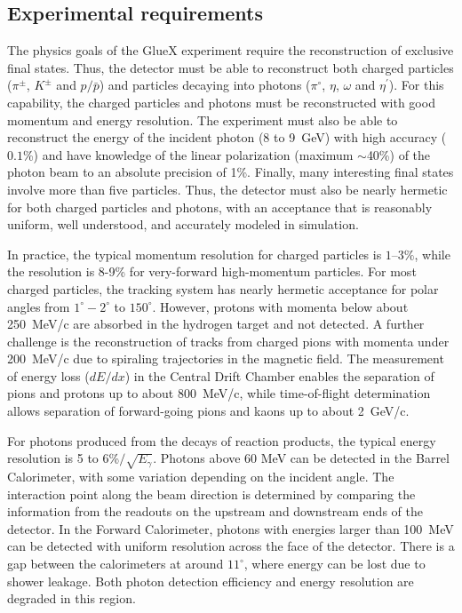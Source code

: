 \subsection[Experimental requirements]{Experimental requirements \label{sec:intro:requirements}}
The physics goals of the GlueX experiment require the reconstruction of exclusive final states. Thus, the \gx{} detector must be able to reconstruct both charged particles ($\pi^{\pm}$, $K^{\pm}$ and $p/\bar{p}$) and particles decaying into photons ($\pi^{\circ}$, $\eta$, $\omega$ and $\eta^{\prime}$). For this capability, the charged particles and photons must be reconstructed with good momentum and energy resolution. The experiment must also be able to reconstruct the energy of the incident photon (8 to 9~GeV) with high accuracy ($0.1$\%) and have knowledge of the linear polarization (maximum $\sim$40\%) of the photon beam to an absolute precision of 1\%. Finally, many interesting final states involve more than five particles. Thus, the \gx{} detector must also be nearly hermetic for both charged particles and photons, with an acceptance that is reasonably uniform, well understood, and accurately modeled in simulation.

In practice, the typical momentum resolution for charged particles is $1$--$3\%$, while the resolution is 8-9\% for very-forward high-momentum particles.  For most charged particles, the tracking system has nearly hermetic acceptance for polar angles from $1^\circ-2^{\circ}$ to $150^{\circ}$. However, protons with momenta below about 250~MeV/c are absorbed in the hydrogen target and not detected. A further challenge is the reconstruction of tracks from charged pions with momenta under 200~MeV/c due to spiraling trajectories in the magnetic field.
The measurement of energy loss ($dE/dx$) in the Central Drift Chamber enables the separation of pions and protons up to about 800~MeV/c, while time-of-flight determination allows separation of forward-going pions and kaons up to about 2~GeV/c.

For photons produced from the decays of reaction products, the typical energy resolution is 5 to 6\%$/\sqrt{E_{\gamma}}$. Photons above 60 MeV can be detected in the Barrel Calorimeter, with some variation depending on the incident angle.
The interaction point along the beam direction is determined by comparing the information from the readouts on the upstream and downstream ends of the detector. In the Forward Calorimeter, photons with energies larger than 100~MeV can be detected with uniform resolution across the face of the detector. There is a gap between the calorimeters at around $11^{\circ}$, where energy can be lost due to shower leakage. Both photon detection efficiency and energy resolution are degraded in this region. 
 
